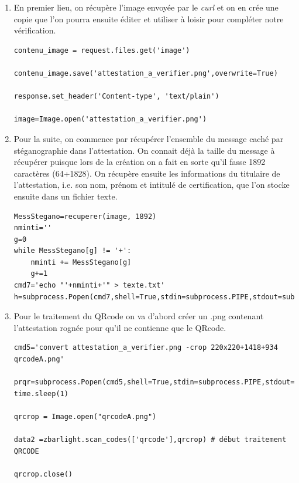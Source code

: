 \documentclass[12pt]{article}
\newcommand{\1}{\mathbbm{1}}
\begin{document}
\begin{enumerate}[label=(\arabic*)]	
	
\item En premier lieu, on récupère l'image envoyée par le \textit{curl} et on en crée une copie que l'on pourra ensuite éditer et utiliser à loisir pour compléter notre vérification. 

\begin{lstlisting}
contenu_image = request.files.get('image')

contenu_image.save('attestation_a_verifier.png',overwrite=True)

response.set_header('Content-type', 'text/plain')

image=Image.open('attestation_a_verifier.png')
\end{lstlisting}
\vspace*{7mm}
\item Pour la suite, on commence par récupérer l'ensemble du message caché par stéganographie dans l'attestation. On connait déjà la taille du message à récupérer puisque lors de la création on a fait en sorte qu'il fasse 1892 caractères (64+1828). On récupère ensuite les informations du titulaire de l'attestation, i.e. son nom, prénom et intitulé de certification, que l'on stocke ensuite dans un fichier texte.

\begin{lstlisting}
MessStegano=recuperer(image, 1892)
nminti=''
g=0
while MessStegano[g] != '+':
	nminti += MessStegano[g]
	g+=1
cmd7='echo "'+nminti+'" > texte.txt'
h=subprocess.Popen(cmd7,shell=True,stdin=subprocess.PIPE,stdout=subprocess.PIPE)
\end{lstlisting}
\vspace*{7mm}

\item Pour le traitement du QRcode on va d'abord créer un .png contenant l'attestation rognée pour qu'il ne contienne que le QRcode.

\begin{lstlisting}
cmd5='convert attestation_a_verifier.png -crop 220x220+1418+934 qrcodeA.png'

prqr=subprocess.Popen(cmd5,shell=True,stdin=subprocess.PIPE,stdout=subprocess.PIPE)
time.sleep(1)

qrcrop = Image.open("qrcodeA.png")

data2 =zbarlight.scan_codes(['qrcode'],qrcrop) # début traitement QRCODE

qrcrop.close()
\end{lstlisting}
\vspace*{7mm}


\end{enumerate}
\end{document}
